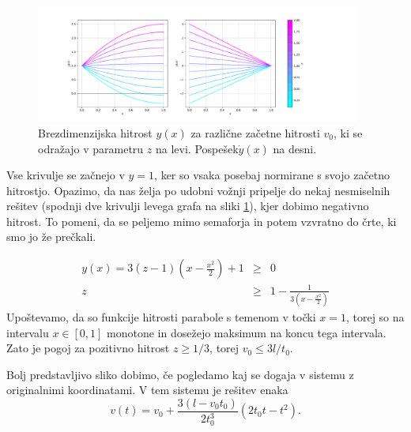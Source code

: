 \documentclass[a4paper, 12pt, slovene]{article}
\numberwithin{equation}{section}
\begin{document}
\begin{figure}[H]
\centering
\includegraphics[width=0.95\textwidth]{grafi/hitrosti_basic.pdf}
\caption{Brezdimenzijska hitrost $y(x)$ za različne začetne hitrosti $v_0$, ki se odražajo v parametru $z$ na levi. Pospešek$\dot{y}(x)$ na desni.}
\label{f:hitrosti-basic}
\end{figure}

Vse krivulje se začnejo v $y=1$, ker so vsaka posebaj normirane s svojo začetno hitrostjo. Opazimo, da nas želja po udobni vožnji pripelje do nekaj nesmiselnih rešitev (spodnji dve krivulji levega grafa na sliki \ref{f:hitrosti-basic}), kjer dobimo negativno hitrost. To pomeni, da se peljemo mimo semaforja in potem vzvratno do črte, ki smo jo že prečkali.

\begin{eqnarray}
y(x) = 3\left( z-1 \right)\left( x - \frac{x^2}{2}\right) + 1 &\geq& 0	\\
z &\geq& 1-\frac{1}{3\left( x- \frac{x^2}{2}\right)}
\end{eqnarray}
Upoštevamo, da so funkcije hitrosti parabole s temenom v točki $x=1$, torej so na intervalu $x\in[0,1]$ monotone in dosežejo maksimum na koncu tega intervala. Zato je pogoj za pozitivno hitrost $z \geq 1/3$, torej $v_0 \leq 3l/t_0$. \par\vspace{5mm}

Bolj predstavljivo sliko dobimo, če pogledamo kaj se dogaja v sistemu z originalnimi koordinatami. V tem sistemu je rešitev enaka
\begin{equation}
v(t) = v_0 + \frac{3(l-v_0t_0)}{2t_0^3}\left( 2t_0t-t^2\right).
\end{equation}
\end{document}
